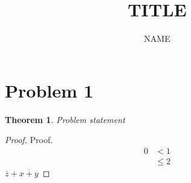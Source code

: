 \documentclass{article}
\title{TITLE}
\author{NAME}
\newtheorem*{theorem}{Theorem}
\newcommand*\conj[1]{\overline{#1}}
\begin{document}
	\section*{Problem 1}
    \begin{theorem}
        Problem statement
    \end{theorem}
    \begin{proof}
        Proof.
        \begin{align*}
            0 &< 1 \tag{Annotation} \\
            &\leq 2 
        \end{align*}
        $\conj{z} + \conj{x+y}$
    \end{proof}
	
	
\end{document}

